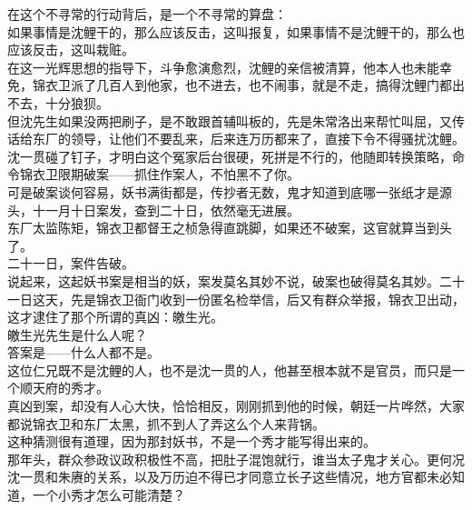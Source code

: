 \begin{multicols}{\theparacolNo}
在这个不寻常的行动背后，是一个不寻常的算盘：\\

如果事情是沈鲤干的，那么应该反击，这叫报复，如果事情不是沈鲤干的，那么也应该反击，这叫栽赃。\\

在这一光辉思想的指导下，斗争愈演愈烈，沈鲤的亲信被清算，他本人也未能幸免，锦衣卫派了几百人到他家，也不进去，也不闹事，就是不走，搞得沈鲤门都出不去，十分狼狈。\\

但沈先生如果没两把刷子，是不敢跟首辅叫板的，先是朱常洛出来帮忙叫屈，又传话给东厂的领导，让他们不要乱来，后来连万历都来了，直接下令不得骚扰沈鲤。\\

沈一贯碰了钉子，才明白这个冤家后台很硬，死拼是不行的，他随即转换策略，命令锦衣卫限期破案——抓住作案人，不怕黑不了你。\\

可是破案谈何容易，妖书满街都是，传抄者无数，鬼才知道到底哪一张纸才是源头，十一月十日案发，查到二十日，依然毫无进展。\\

东厂太监陈矩，锦衣卫都督王之桢急得直跳脚，如果还不破案，这官就算当到头了。\\

二十一日，案件告破。\\

说起来，这起妖书案是相当的妖，案发莫名其妙不说，破案也破得莫名其妙。二十一日这天，先是锦衣卫衙门收到一份匿名检举信，后又有群众举报，锦衣卫出动，这才逮住了那个所谓的真凶：皦生光。\\

皦生光先生是什么人呢？\\

答案是——什么人都不是。\\

这位仁兄既不是沈鲤的人，也不是沈一贯的人，他甚至根本就不是官员，而只是一个顺天府的秀才。\\

真凶到案，却没有人心大快，恰恰相反，刚刚抓到他的时候，朝廷一片哗然，大家都说锦衣卫和东厂太黑，抓不到人了弄这么个人来背锅。\\

这种猜测很有道理，因为那封妖书，不是一个秀才能写得出来的。\\

那年头，群众参政议政积极性不高，把肚子混饱就行，谁当太子鬼才关心。更何况沈一贯和朱赓的关系，以及万历迫不得已才同意立长子这些情况，地方官都未必知道，一个小秀才怎么可能清楚？\\


\end{multicols}
